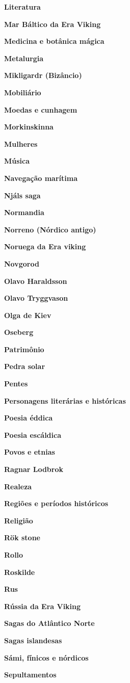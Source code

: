 \textbf{Literatura}

\textbf{Mar Báltico da Era Viking}

\textbf{Medicina e botânica mágica}

\textbf{Metalurgia}

\textbf{Mikligardr (Bizâncio)}

\textbf{Mobiliário}

\textbf{Moedas e cunhagem}

\textbf{Morkinskinna}

\textbf{Mulheres}

\textbf{Música}

\textbf{Navegação marítima}

\textbf{Njáls saga}

\textbf{Normandia}

\textbf{Norreno (Nórdico antigo)}

\textbf{Noruega da Era viking}

\textbf{Novgorod}

\textbf{Olavo Haraldsson}

\textbf{Olavo Tryggvason}

\textbf{Olga de Kiev}

\textbf{Oseberg}

\textbf{Patrimônio}

\textbf{Pedra solar}

\textbf{Pentes}

\textbf{Personagens literárias e históricas}

\textbf{Poesia éddica}

\textbf{Poesia escáldica}

\textbf{Povos e etnias}

\textbf{Ragnar Lodbrok}

\textbf{Realeza}

\textbf{Regiões e períodos históricos}

\textbf{Religião}

\textbf{Rök stone}

\textbf{Rollo}

\textbf{Roskilde}

\textbf{Rus}

\textbf{Rússia da Era Viking}

\textbf{Sagas do Atlântico Norte}

\textbf{Sagas islandesas}

\textbf{Sámi, fínicos e nórdicos}

\textbf{Sepultamentos}

